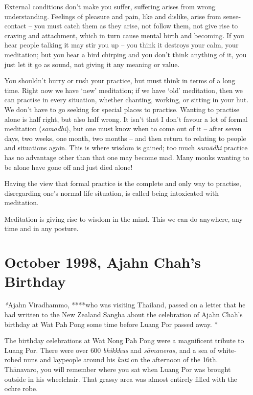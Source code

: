 External conditions don't make you suffer, suffering arises from wrong
understanding. Feelings of pleasure and pain, like and dislike, arise
from sense-contact -- you must catch them as they arise, not follow
them, not give rise to craving and attachment, which in turn cause
mental birth and becoming. If you hear people talking it may stir you up
-- you think it destroys your calm, your meditation; but you hear a bird
chirping and you don't think anything of it, you just let it go as
sound, not giving it any meaning or value. 

You shouldn't hurry or rush your practice, but must think in terms of a
long time. Right now we have `new' meditation; if we have `old'
meditation, then we can practise in every situation, whether chanting, 
working, or sitting in your hut. We don't have to go seeking for special
places to practise. Wanting to practise alone is half right, but also
half wrong. It isn't that I don't favour a lot of formal meditation
 (\emph{samādhi}), but one must know when to come out of it -- after
seven days, two weeks, one month, two months -- and then return to
relating to people and situations again. This is where wisdom is gained; 
too much \emph{samādhi} practice has no advantage other than that one
may become mad. Many monks wanting to be alone have gone off and just
died alone! 

Having the view that formal practice is the complete and only way to
practise, disregarding one's normal life situation, is called being
intoxicated with meditation. 

Meditation is giving rise to wisdom in the mind. This we can do
anywhere, any time and in any posture. 

\chapter{October 1998, Ajahn Chah's Birthday}

\emph{*}Ajahn Viradhammo, ****who was visiting Thailand, passed on a
letter that he had written to the New Zealand Sangha about the
celebration of Ajahn Chah's birthday at Wat Pah Pong some time before
Luang Por passed away. *

The birthday celebrations at Wat Nong Pah Pong were a magnificent
tribute to Luang Por. There were over 600 \emph{bhikkhus} and
\emph{sāmaneras,} and a sea of white-robed nuns and laypeople around his
\emph{kuti} on the afternoon of the 16th. Thānavaro, you will remember
where you sat when Luang Por was brought outside in his wheelchair. That
grassy area was almost entirely filled with the ochre robe. 

